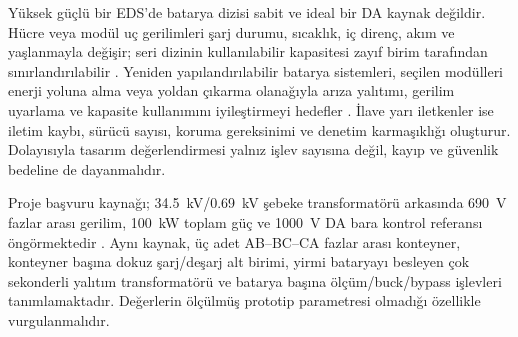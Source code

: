 Yüksek güçlü bir EDS'de batarya dizisi sabit ve ideal bir DA kaynak değildir. Hücre veya modül uç gerilimleri şarj durumu, sıcaklık, iç direnç, akım ve yaşlanmayla değişir; seri dizinin kullanılabilir kapasitesi zayıf birim tarafından sınırlandırılabilir \citep{Plett2015,Hannan2017,Farakhor2023}. Yeniden yapılandırılabilir batarya sistemleri, seçilen modülleri enerji yoluna alma veya yoldan çıkarma olanağıyla arıza yalıtımı, gerilim uyarlama ve kapasite kullanımını iyileştirmeyi hedefler \citep{Momayyezan2016,Farakhor2023,Huang2024}. İlave yarı iletkenler ise iletim kaybı, sürücü sayısı, koruma gereksinimi ve denetim karmaşıklığı oluşturur. Dolayısıyla tasarım değerlendirmesi yalnız işlev sayısına değil, kayıp ve güvenlik bedeline de dayanmalıdır.

Proje başvuru kaynağı; \SI{34.5}{\kilo\volt}/\SI{0.69}{\kilo\volt} şebeke transformatörü arkasında \SI{690}{\volt} fazlar arası gerilim, \SI{100}{\kilo\watt} toplam güç ve \SI{1000}{\volt} DA bara kontrol referansı öngörmektedir \citep{Arifoglu2023Basvuru}. Aynı kaynak, üç adet AB--BC--CA fazlar arası konteyner, konteyner başına dokuz şarj/deşarj alt birimi, yirmi bataryayı besleyen çok sekonderli yalıtım transformatörü ve batarya başına ölçüm/buck/bypass işlevleri tanımlamaktadır. Değerlerin ölçülmüş prototip parametresi olmadığı özellikle vurgulanmalıdır.

